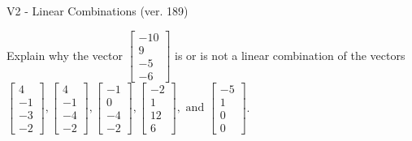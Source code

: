 \begin{exercise}
  \begin{exerciseTitle}V2 - Linear Combinations (ver. 189)\end{exerciseTitle}
  \begin{exerciseStatement}
    Explain why the vector \(\left[\begin{array}{c}
-10 \\
9 \\
-5 \\
-6
\end{array}\right]\)  is or is not a linear 
	combination of the vectors \(\left[\begin{array}{c}
4 \\
-1 \\
-3 \\
-2
\end{array}\right] , \left[\begin{array}{c}
4 \\
-1 \\
-4 \\
-2
\end{array}\right] , \left[\begin{array}{c}
-1 \\
0 \\
-4 \\
-2
\end{array}\right] , \left[\begin{array}{c}
-2 \\
1 \\
12 \\
6
\end{array}\right] , \text{ and } \left[\begin{array}{c}
-5 \\
1 \\
0 \\
0
\end{array}\right]\).
	



\end{exerciseStatement}
\end{exercise}
